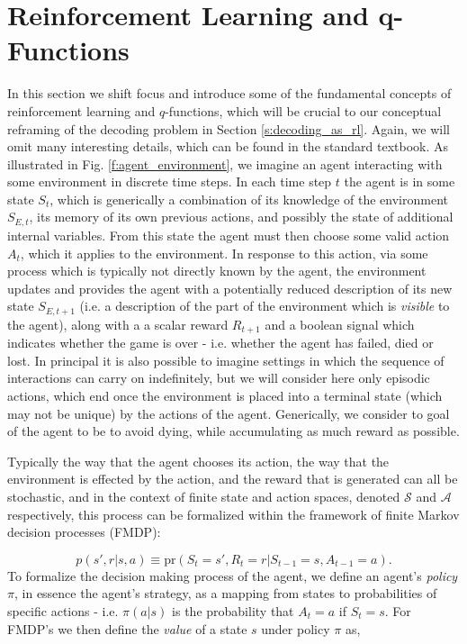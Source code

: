 \documentclass[twocolumn,preprintnumbers,amsmath,amssymb,notitlepage,nofootinbib,longbibliography,superscriptaddress,aps,pra,10pt]{revtex4-1}
\begin{document}
\section{Reinforcement Learning and q-Functions}\label{s:reinforcement_learning}

    In this section we shift focus and introduce some of the fundamental concepts of reinforcement learning and $q$-functions, which will be crucial to our conceptual reframing of the decoding problem in Section \ref{s:decoding_as_rl}. 
    Again, we will omit many interesting details, which can be found in the standard textbook. 
    As illustrated in Fig. \ref{f:agent_environment}, we imagine an agent interacting with some environment in discrete time steps. 
    In each time step $t$ the agent is in some state $S_t$, which is generically a combination of its knowledge of the environment $S_{E,t}$, its memory of its own previous actions, and possibly the state of additional internal variables. 
    From this state the agent must then choose some valid action $A_t$, which it applies to the environment. 
    In response to this action, via some process which is typically not directly known by the agent, the environment updates and provides the agent with a potentially reduced description of its new state $S_{E,t+1}$ (i.e. a description of the part of the environment which is \textit{visible} to the agent), along with a a scalar reward $R_{t+1}$ and a boolean signal which indicates whether the game is over - i.e. whether the agent has failed, died or lost. 
    In principal it is also possible to imagine settings in which the sequence of interactions can carry on indefinitely, but we will consider here only episodic actions, which end once the environment is placed into a terminal state (which may not be unique) by the actions of the agent. 
    Generically, we consider to goal of the agent to be to avoid dying, while accumulating as much reward as possible.

    Typically the way that the agent chooses its action, the way that the environment is effected by the action, and the reward that is generated can all be stochastic, and in the context of finite state and action spaces, denoted $\mathcal{S}$ and $\mathcal{A}$ respectively, this process can be formalized within the framework of finite Markov decision processes (FMDP):

    \begin{equation}
        p(s',r|s,a) \equiv \mathrm{pr}(S_t = s',R_t = r|S_{t-1} = s, A_{t-1} = a).
    \end{equation}
    To formalize the decision making process of the agent, we define an agent's \textit{policy} $\pi$, in essence the agent's strategy, as a mapping from states to probabilities of specific actions - i.e. $\pi(a|s)$ is the probability that $A_t = a$ if $S_t = s$. 
    For FMDP's we then define the \textit{value} of a state $s$ under policy $\pi$ as,
\end{document}
